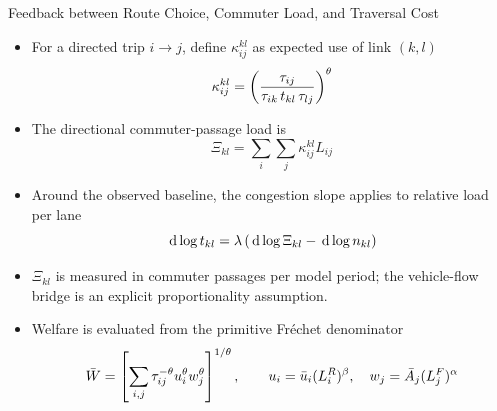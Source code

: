 \documentclass[11pt,aspectratio=169]{beamer}
\newcommand{\dd}{\,\mathrm{d}}
\newcommand{\app}[1]{\allowbreak\hspace{0.25em}\hyperlink{#1}{\beamergotobutton{details}}}
\begin{document}
\begin{frame}{Feedback between Route Choice, Commuter Load, and Traversal Cost}
\begin{itemize}
  \item For a directed trip $i\to j$, define $\kappa^{kl}_{ij}$ as expected use of link $(k,l)$
  \vspace{-1em}\begin{equation}
    \kappa^{kl}_{ij} = \left( \frac{\tau_{ij}} {\tau_{ik}\,t_{kl}\,\tau_{lj}} \right)^\theta
  \vspace{-0.5em}\end{equation}
  \item The directional commuter-passage load is
  \begin{equation}\label{eq:Xi_c}
  \Xi_{kl} = \sum_i\sum_j \kappa^{kl}_{ij}L_{ij}
  \end{equation}
  \item Around the observed baseline, the congestion slope applies to relative load per lane
  \vspace{-0.5em}\begin{equation}\label{eq:c_Xi}
    \dd\log t_{kl}=\lambda\left(\dd\log\Xi_{kl}-\dd\log n_{kl}\right)
  \vspace{-0.5em}\end{equation}
  \item $\Xi_{kl}$ is measured in commuter passages per model period; the vehicle-flow bridge is an explicit proportionality assumption. \app{appflowbridge}
  \item Welfare is evaluated from the primitive Fr\'echet denominator
  \vspace{-0.5em}\begin{equation}
    \bar W
    =
    \left[
    \sum_{i,j}\tau_{ij}^{-\theta}u_i^\theta w_j^\theta
    \right]^{1/\theta},
    \qquad
    u_i=\bar u_i(L_i^R)^\beta,\quad
    w_j=\bar A_j(L_j^F)^\alpha
  \vspace{-0.8em}\end{equation}
\end{itemize}
\end{frame}
\end{document}

